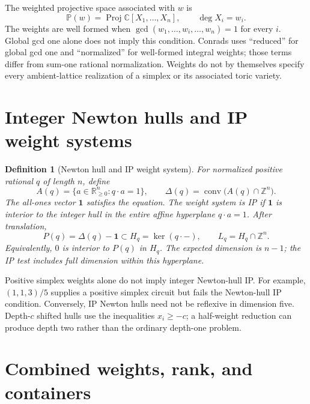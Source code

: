 \documentclass[11pt,a4paper,oneside]{report}
\newtheorem{definition}{Definition}[chapter]
\begin{document}
The weighted projective space associated with \(w\) is
\[
  \mathbb{P}(w)=\operatorname{Proj}\mathbb{C}[X_1,\ldots,X_n],
  \qquad \deg X_i=w_i.
\]
The weights are well formed when
\(\gcd(w_1,\ldots,\widehat{w_i},\ldots,w_n)=1\) for every \(i\).
Global gcd one alone does not imply this condition.
Conrads uses ``reduced'' for global gcd one and ``normalized'' for
well-formed integral weights; those terms differ from sum-one rational
normalization. Weights do not by themselves specify every ambient-lattice
realization of a simplex or its associated toric variety.

\section{Integer Newton hulls and IP weight systems}

\begin{definition}[Newton hull and IP weight system]
For normalized positive rational \(q\) of length \(n\), define
\[
  A(q)=\{a\in\mathbb{R}_{\geq0}^{n}:q\cdot a=1\},
  \qquad
  \Delta(q)=\operatorname{conv}\bigl(A(q)\cap\mathbb{Z}^{n}\bigr).
\]
The all-ones vector \(\mathbf{1}\) satisfies the equation.
The weight system is IP if \(\mathbf{1}\) is interior to the integer hull
in the entire affine hyperplane \(q\cdot a=1\).
After translation,
\[
  P(q)=\Delta(q)-\mathbf{1}\subset H_q=\ker(q\cdot-),\qquad
  L_q=H_q\cap\mathbb{Z}^{n}.
\]
Equivalently, \(0\) is interior to \(P(q)\) in \(H_q\).
The expected dimension is \(n-1\); the IP test includes full dimension
within this hyperplane.
\end{definition}

Positive simplex weights alone do not imply integer Newton-hull IP.
For example, \((1,1,3)/5\) supplies a positive simplex circuit but fails
the Newton-hull IP condition. Conversely, IP Newton hulls need not be
reflexive in dimension five. Depth-\(c\) shifted hulls use the inequalities
\(x_i\geq-c\); a half-weight reduction can produce depth two rather than
the ordinary depth-one problem.

\section{Combined weights, rank, and containers}
\end{document}
